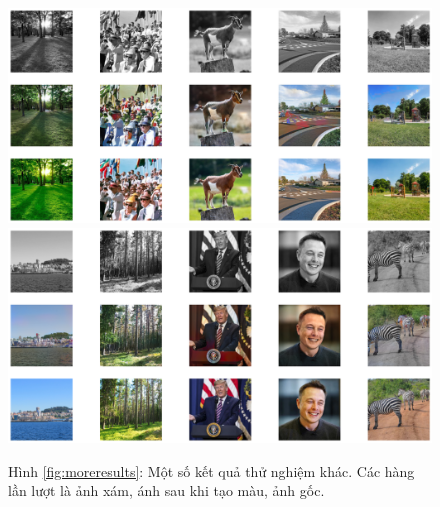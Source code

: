 \documentclass[a4paper, 12pt]{article}
\begin{document}
\begin{figure}[!h]
\captionsetup{width=0.8\textwidth}
\centering
\includegraphics[width=15cm]{images/demo1.png}
\includegraphics[width=15cm]{images/demo2.png}
\caption*{Hình \ref{fig:moreresults}: Một số kết quả thử nghiệm khác. Các hàng lần lượt là ảnh xám, ánh sau khi tạo màu, ảnh gốc.}
\end{figure}
\end{document}
